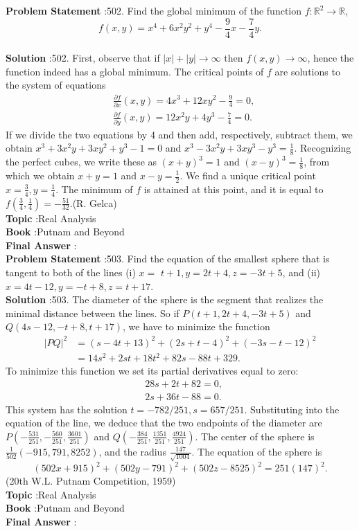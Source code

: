 \documentclass[10pt]{article}
\begin{document}
\textbf{Problem Statement} :502. Find the global minimum of the function $f: \mathbb{R}^{2} \rightarrow \mathbb{R}$, $$ f(x, y)=x^{4}+6 x^{2} y^{2}+y^{4}-\frac{9}{4} x-\frac{7}{4} y . $$\\
\textbf{Solution} :502. First, observe that if $|x|+|y| \rightarrow \infty$ then $f(x, y) \rightarrow \infty$, hence the function indeed has a global minimum. The critical points of $f$ are solutions to the system of equations$$ \begin{aligned} &\frac{\partial f}{\partial x}(x, y)=4 x^{3}+12 x y^{2}-\frac{9}{4}=0, \\ &\frac{\partial f}{\partial y}(x, y)=12 x^{2} y+4 y^{3}-\frac{7}{4}=0 . \end{aligned} $$If we divide the two equations by 4 and then add, respectively, subtract them, we obtain $x^{3}+3 x^{2} y+3 x y^{2}+y^{3}-1=0$ and $x^{3}-3 x^{2} y+3 x y^{3}-y^{3}=\frac{1}{8}$. Recognizing the perfect cubes, we write these as $(x+y)^{3}=1$ and $(x-y)^{3}=\frac{1}{8}$, from which we obtain $x+y=1$ and $x-y=\frac{1}{2}$. We find a unique critical point $x=\frac{3}{4}, y=\frac{1}{4}$. The minimum of $f$ is attained at this point, and it is equal to $f\left(\frac{3}{4}, \frac{1}{4}\right)=-\frac{51}{32}$.(R. Gelca)\\
\textbf{Topic} :Real Analysis\\
\textbf{Book} :Putnam and Beyond\\
\textbf{Final Answer} :\\


\textbf{Problem Statement} :503. Find the equation of the smallest sphere that is tangent to both of the lines (i) $x=$ $t+1, y=2 t+4, z=-3 t+5$, and (ii) $x=4 t-12, y=-t+8, z=t+17$.\\
\textbf{Solution} :503. The diameter of the sphere is the segment that realizes the minimal distance between the lines. So if $P(t+1,2 t+4,-3 t+5)$ and $Q(4 s-12,-t+8, t+17)$, we have to minimize the function$$ \begin{aligned} |P Q|^{2} &=(s-4 t+13)^{2}+(2 s+t-4)^{2}+(-3 s-t-12)^{2} \\ &=14 s^{2}+2 s t+18 t^{2}+82 s-88 t+329 . \end{aligned} $$To minimize this function we set its partial derivatives equal to zero:$$ \begin{aligned} &28 s+2 t+82=0, \\ &2 s+36 t-88=0 . \end{aligned} $$This system has the solution $t=-782 / 251, s=657 / 251$. Substituting into the equation of the line, we deduce that the two endpoints of the diameter are $P\left(-\frac{531}{251},-\frac{560}{251}, \frac{3601}{251}\right)$ and $Q\left(-\frac{384}{251}, \frac{1351}{251}, \frac{4924}{251}\right)$. The center of the sphere is $\frac{1}{502}(-915,791,8252)$, and the radius $\frac{147}{\sqrt{1004}}$. The equation of the sphere is$$ (502 x+915)^{2}+(502 y-791)^{2}+(502 z-8525)^{2}=251(147)^{2} . $$(20th W.L. Putnam Competition, 1959)\\
\textbf{Topic} :Real Analysis\\
\textbf{Book} :Putnam and Beyond\\
\textbf{Final Answer} :\\
\end{document}
